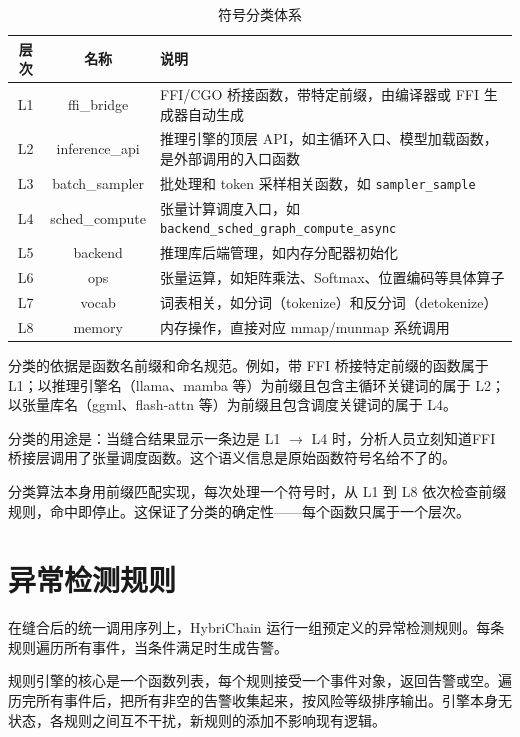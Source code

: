 \begin{table}[H]
    \centering
    \caption{符号分类体系}
    \label{tab:layer_classification}
    \begin{tabular}{|c|c|p{7.5cm}|}
        \hline
        \textbf{层次} & \textbf{名称} & \textbf{说明} \\
        \hline
        L1 & ffi\_bridge & FFI/CGO 桥接函数，带特定前缀，由编译器或 FFI 生成器自动生成 \\
        \hline
        L2 & inference\_api & 推理引擎的顶层 API，如主循环入口、模型加载函数，是外部调用的入口函数 \\
        \hline
        L3 & batch\_sampler & 批处理和 token 采样相关函数，如 \texttt{sampler\_sample} \\
        \hline
        L4 & sched\_compute & 张量计算调度入口，如 \texttt{backend\_sched\_graph\_compute\_async} \\
        \hline
        L5 & backend & 推理库后端管理，如内存分配器初始化 \\
        \hline
        L6 & ops & 张量运算，如矩阵乘法、Softmax、位置编码等具体算子 \\
        \hline
        L7 & vocab & 词表相关，如分词（tokenize）和反分词（detokenize） \\
        \hline
        L8 & memory & 内存操作，直接对应 mmap/munmap 系统调用 \\
        \hline
    \end{tabular}
\end{table}

分类的依据是函数名前缀和命名规范。例如，带 FFI 桥接特定前缀的函数属于 L1；以推理引擎名（llama、mamba 等）为前缀且包含主循环关键词的属于 L2；以张量库名（ggml、flash-attn 等）为前缀且包含调度关键词的属于 L4。

分类的用途是：当缝合结果显示一条边是 L1 $\to$ L4 时，分析人员立刻知道\textquotedbl FFI 桥接层调用了张量调度函数\textquotedbl 。这个语义信息是原始函数符号名给不了的。

分类算法本身用前缀匹配实现，每次处理一个符号时，从 L1 到 L8 依次检查前缀规则，命中即停止。这保证了分类的确定性——每个函数只属于一个层次。

\section{异常检测规则}

在缝合后的统一调用序列上，HybriChain 运行一组预定义的异常检测规则。每条规则遍历所有事件，当条件满足时生成告警。

规则引擎的核心是一个函数列表，每个规则接受一个事件对象，返回告警或空。遍历完所有事件后，把所有非空的告警收集起来，按风险等级排序输出。引擎本身无状态，各规则之间互不干扰，新规则的添加不影响现有逻辑。

